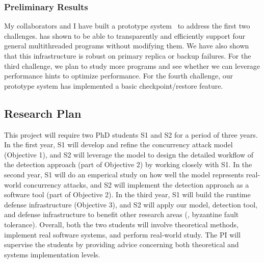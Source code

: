 
\vspace{-.15in}\subsubsection{Preliminary Results} 
\label{sec:defense-result}\vspace{-.075in}

My collaborators and I have built a prototype system~\cite{crane:sosp15} to 
address the first two challenges. \crane has shown to be able to transparently 
and efficiently support four general multithreaded programs without modifying 
them. We have also shown that this infrastructure is robust on primary replica 
or backup failures. For the third challenge, we plan to study more 
programs and see whether we can leverage performance hints to optimize 
performance. For the fourth challenge, our prototype system \crane has 
implemented a basic checkpoint/restore feature.

\vspace{-.15in}\subsection{Research Plan} \label{sec:plan}\vspace{-.075in}

This \xxx project will require two PhD students S1 and S2 for a period of 
three years. In the first year, S1 will develop and refine the concurrency 
attack model (Objective 1), and S2 will leverage the model to design the 
detailed workflow of the detection approach (part of Objective 2) by working 
closely with S1. In the second year, S1 will do an emperical study on how well 
the model represents real-world concurrency attacks, and S2 will implement 
the detection approach as a software tool (part of Objective 2). In the third 
year, S1 will build the runtime defense infrastructure (Objective 3), and S2 
will apply our model, detection tool, and defense infrastructure to benefit 
other research areas (\eg, byzantine fault tolerance). Overall, both the two 
students will involve theoretical methods, implement real software systems, and 
perform real-world study. The PI will supervise the students by providing advice 
concerning both theoretical and systems implementation levels.


